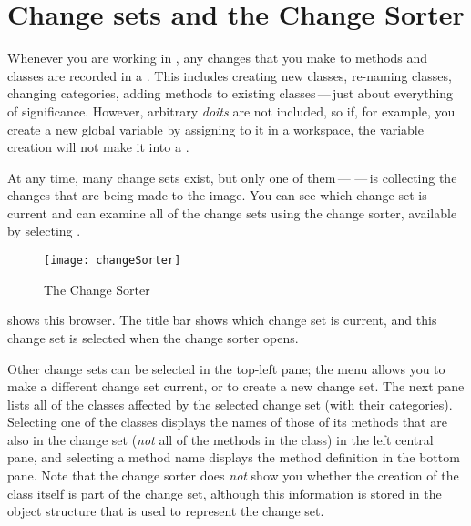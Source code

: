 \documentclass[a4paper,10pt,twoside]{book}
\begin{document}

\section{Change sets and the Change Sorter}

Whenever you are working in \pharo, any changes that you make to methods and classes are recorded in a .
This includes creating new classes, re-naming classes, changing categories, adding methods to existing classes\,---\,just about everything of significance.  
However, arbitrary \emph{doits} are not included, so if, for example, you create a new global variable by assigning to it in a workspace, the variable creation will not make it into a .

At any time, many change sets exist, but only one of them\,---\,\,---\,is collecting the changes that are being made to the image.  
You can see which change set is current and can examine all of the change sets using the  change sorter, available by selecting .

\begin{figure}[btp]
	\begin{center}
		\texttt{[image: changeSorter]}
	\end{center}
	\caption{The Change Sorter}
\end{figure}

 shows this browser.  The title bar shows which change set is current, and this change set is selected when the change sorter opens. 

Other change sets can be selected in the top-left pane; the \actclick menu allows you to make a different change set current, or to create a new change set.
The next pane lists all of the classes affected by the selected change set (with their categories).
Selecting one of the classes displays the names of those of its methods that are also in the change set (\emph{not} all of the methods in the class) in the left central pane, and selecting a method name displays the method definition in the bottom pane.
Note that the change sorter does \emph{not} show you whether the creation of the class itself is part of the change set, although this information is stored in the object structure that is used to represent the change set.
\end{document}
